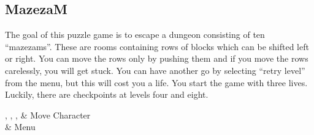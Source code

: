 \subsection{MazezaM}

The goal of this puzzle game is to escape a dungeon consisting of ten
``mazezams''.
These are rooms containing rows of blocks which can be shifted left or
right.
You can move the rows only by pushing them and if you move the rows
carelessly, you will get stuck.
You can have another go by selecting ``retry level'' from the menu,
but this will cost you a life.
You start the game with three lives.
Luckily, there are checkpoints at levels four and eight.

\begin{table}
\begin{btnmap}{}{}
        {\ButtonUp, \ButtonDown,}%
    \ButtonLeft, \ButtonRight
    & Move Character\\
    & Menu\\
\end{btnmap}
\end{table}

